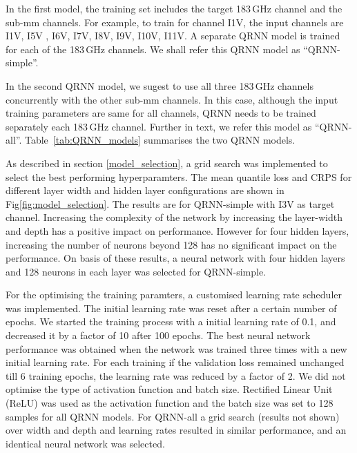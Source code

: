 \documentclass[amt, manuscript]{copernicus}
\begin{document}
In the first model, the training set includes the target 183\,GHz channel and the sub-mm channels. For example, to train for channel I1V, the input channels are I1V, I5V , I6V, I7V, I8V, I9V, I10V, I11V. A separate QRNN model is trained for each of the 183\,GHz channels. We shall refer this QRNN model as ``QRNN-simple''. 

In the second QRNN model, we sugest to use all three 183\,GHz channels concurrently  with the other sub-mm channels. In this case, although the input training parameters are same for all channels, QRNN needs to be trained separately each 183\,GHz channel. Further in text, we refer this model as ``QRNN-all''. Table~\ref{tab:QRNN_models} summarises the two QRNN models. 

As described in section \ref{model_selection}, a grid search was implemented to select the best performing hyperparamters. The mean quantile loss and CRPS for different layer width and hidden layer configurations are shown in Fig\ref{fig:model_selection}. The results are for QRNN-simple with I3V as target channel. Increasing the complexity of the network by increasing the layer-width and depth has a positive impact on performance. However for four hidden layers, increasing the number of neurons beyond 128 has no significant impact on the performance. On basis of these results, a neural network with four hidden layers and 128 neurons in each layer was selected for QRNN-simple. 

For the optimising the training paramters, a customised  learning rate scheduler was implemented. The initial learning rate was reset after a certain number of epochs.  We started the training process with a initial learning rate of 0.1, and decreased it by a factor of 10 after 100 epochs. The best neural network performance was obtained when the network was trained three times with a new initial learning rate. For each training  if the validation loss remained unchanged till 6 training epochs, the learning rate was reduced by a factor of 2. We did not optimise the type of activation function and batch size. Rectified Linear Unit (ReLU) was used as the activation function  and the batch size was set to 128 samples for all QRNN models. 
For QRNN-all a grid search (results not shown) over width and depth and learning rates resulted in similar performance, and an identical neural network was selected.
\end{document}
